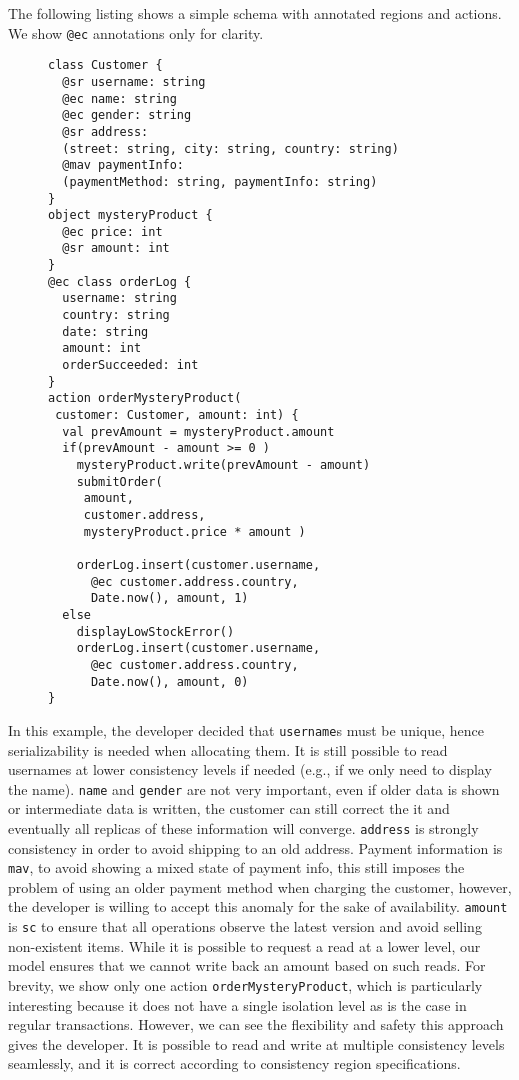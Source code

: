 \documentclass[preprint,numbers]{sigplanconf}
\begin{document}
The following listing shows a simple schema with annotated regions and actions.
We show \texttt{@ec} annotations only for clarity.
\begin{figure}[t!] 
\begin{lstlisting}[basicstyle=\small\ttfamily]
class Customer {
  @sr username: string
  @ec name: string
  @ec gender: string
  @sr address: 
  (street: string, city: string, country: string) 
  @mav paymentInfo:
  (paymentMethod: string, paymentInfo: string)
}
object mysteryProduct {
  @ec price: int
  @sr amount: int
}
@ec class orderLog {
  username: string
  country: string
  date: string
  amount: int
  orderSucceeded: int
}
action orderMysteryProduct(
 customer: Customer, amount: int) {
  val prevAmount = mysteryProduct.amount
  if(prevAmount - amount >= 0 )
    mysteryProduct.write(prevAmount - amount)
    submitOrder(
     amount, 
     customer.address, 
     mysteryProduct.price * amount )

    orderLog.insert(customer.username, 
      @ec customer.address.country, 
      Date.now(), amount, 1)
  else 
    displayLowStockError() 
    orderLog.insert(customer.username, 
      @ec customer.address.country, 
      Date.now(), amount, 0)
}
\end{lstlisting}
\end{figure}

In this example, the developer decided that \texttt{username}s must be 
unique, hence serializability is needed
when allocating them. It is still possible to read usernames at lower
consistency levels if needed (e.g., if we only need to display the name). 
\texttt{name} and \texttt{gender} are not very important, even if older
data is shown or intermediate data is written, the customer can still correct
the it and eventually all replicas of these information will converge.
\texttt{address} is strongly consistency in order to avoid shipping to an old address.
Payment information is \texttt{mav}, to avoid showing a mixed state of payment info, this still
imposes the problem of using an older payment method when charging the customer,
however, the developer is willing to accept this anomaly for the sake of
availability. \texttt{amount} is \texttt{sc} to ensure that all operations
observe the latest version and avoid selling non-existent items. While it is possible to request a read at a lower
level, our model ensures that we cannot write back an amount based on such reads. For brevity,
we show only one action \texttt{orderMysteryProduct}, which is particularly interesting because it does
not have a single isolation level as is the case in regular transactions.
However, we can see the flexibility and safety this approach gives the
developer. It is possible to read and write at multiple consistency levels
seamlessly, and it is correct according to consistency region specifications.
\end{document}
